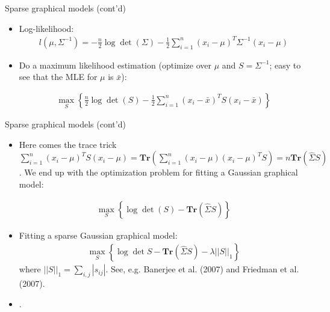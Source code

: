 \documentclass[12pt, trans]{beamer}
\newcommand{\1}[1]{{\mathbf 1}\left\{#1\right\}}        %
\def\lp{\left(}
\def\rp{\right)}
\begin{document}
\begin{frame}[fragile]{Sparse graphical models (cont'd)}

\begin{itemize}[<+->]
\item  Log-likelihood:
\begin{align*}
l(\mu,\Sigma^{-1}) = -\frac{n}{2}\log \det \lp \Sigma \rp  -\frac{1}{2} \sum_{i=1}^n(x_i-\mu)^T\Sigma^{-1}(x_i-\mu)
\end{align*}

\item Do a maximum likelihood estimation (optimize over $\mu$ and $S = \Sigma^{-1}$; easy to see that the MLE for $\mu$ is $\bar{x}$):

\begin{align*}
\max_S\left\{  \frac{n}{2}\log \det\lp S \rp  -\frac{1}{2} \sum_{i=1}^n(x_i-\bar{x})^T S (x_i-\bar{x})\right\} 
\end{align*}


\end{itemize}

\end{frame}

\begin{frame}[fragile]{Sparse graphical models (cont'd)}

\begin{itemize}[<+->]
\item  Here comes the trace trick $\sum_{i=1}^n(x_i-\mu)^T S (x_i-\mu) = \textbf{Tr} (\sum_{i=1}^n (x_i-\mu)(x_i-\mu)^TS) = n\textbf{Tr}(\hat{\Sigma}S)$. We end up with the optimization problem for fitting a Gaussian graphical model:

\begin{align*}
\max_S \left\{  \log \det \lp S\rp - \textbf{Tr}\lp \hat{\Sigma}S \rp  \right\}
\end{align*}

\item  Fitting a sparse Gaussian graphical model:
\begin{align*}
\max_S \left\{ \log \det S - \textbf{Tr} \lp \hat{\Sigma}S \rp - \lambda ||S||_1 \right\}
\end{align*}
where $||S||_1 = \sum_{i,j}|s_{ij}|$. See, e.g. Banerjee et al. (2007) and Friedman et al. (2007). 

\end{itemize}

\end{frame}

\begin{frame}{}

\begin{itemize}[<+->]
\item .
\end{itemize}

\end{frame}
\end{document}
